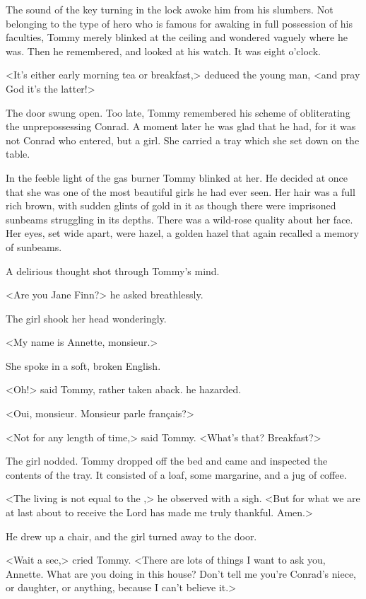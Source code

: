 The sound of the key turning in the lock awoke him from his slumbers. Not belonging to the type of hero who is famous for awaking in full possession of his faculties, Tommy merely blinked at the ceiling and wondered vaguely where he was. Then he remembered, and looked at his watch. It was eight o'clock.

<It's either early morning tea or breakfast,> deduced the young man, <and pray God it's the latter!>

The door swung open. Too late, Tommy remembered his scheme of obliterating the unprepossessing Conrad. A moment later he was glad that he had, for it was not Conrad who entered, but a girl. She carried a tray which she set down on the table.

In the feeble light of the gas burner Tommy blinked at her. He decided at once that she was one of the most beautiful girls he had ever seen. Her hair was a full rich brown, with sudden glints of gold in it as though there were imprisoned sunbeams struggling in its depths. There was a wild-rose quality about her face. Her eyes, set wide apart, were hazel, a golden hazel that again recalled a memory of sunbeams.

A delirious thought shot through Tommy's mind.

<Are you Jane Finn?> he asked breathlessly.

The girl shook her head wonderingly.

<My name is Annette, monsieur.>

She spoke in a soft, broken English.

<Oh!> said Tommy, rather taken aback.  he hazarded.

<Oui, monsieur. Monsieur parle français?>

<Not for any length of time,> said Tommy. <What's that? Breakfast?>

The girl nodded. Tommy dropped off the bed and came and inspected the contents of the tray. It consisted of a loaf, some margarine, and a jug of coffee.

<The living is not equal to the ,> he observed with a sigh. <But for what we are at last about to receive the Lord has made me truly thankful. Amen.>

He drew up a chair, and the girl turned away to the door.

<Wait a sec,> cried Tommy. <There are lots of things I want to ask you, Annette. What are you doing in this house? Don't tell me you're Conrad's niece, or daughter, or anything, because I can't believe it.>

